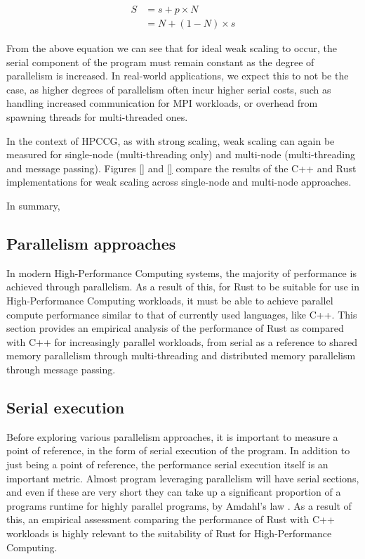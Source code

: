 \begin{align}
    S &= s + p \times N \\
      &= N + (1 - N) \times s
\end{align}

From the above equation we can see that for ideal weak scaling to occur, the serial component of the program must remain constant as the degree of parallelism is increased. In real-world applications, we expect this to not be the case, as higher degrees of parallelism often incur higher serial costs, such as handling increased communication for MPI workloads, or overhead from spawning threads for multi-threaded ones.

In the context of HPCCG, as with strong scaling, weak scaling can again be measured for single-node (multi-threading only) and multi-node (multi-threading and message passing). Figures \ref{} and \ref{} compare the results of the C++ and Rust implementations for weak scaling across single-node and multi-node approaches.


In summary,


\subsection{Parallelism approaches}
\label{ssec:parallelism-approaches}

In modern High-Performance Computing systems, the majority of performance is achieved through parallelism. As a result of this, for Rust to be suitable for use in High-Performance Computing workloads, it must be able to achieve parallel compute performance similar to that of currently used languages, like C++. This section provides an empirical analysis of the performance of Rust as compared with C++ for increasingly parallel workloads, from serial as a reference to shared memory parallelism through multi-threading and distributed memory parallelism through message passing.

\subsection{Serial execution}
\label{ssec:multi-threaded}

Before exploring various parallelism approaches, it is important to measure a point of reference, in the form of serial execution of the program. In addition to just being a point of reference, the performance serial execution itself is an important metric. Almost program leveraging parallelism will have serial sections, and even if these are very short they can take up a significant proportion of a programs runtime for highly parallel programs, by Amdahl's law \cite{amdahlsLaw}. As a result of this, an empirical assessment comparing the performance of Rust with C++ workloads is highly relevant to the suitability of Rust for High-Performance Computing.

